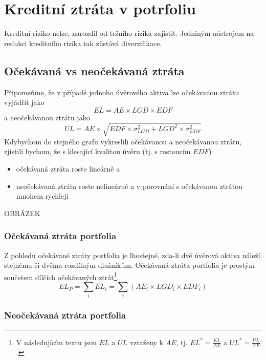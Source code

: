 \chapter{Kreditní ztráta v potrfoliu}

Kreditní riziko nelze, narozdíl od tržního rizika zajistit. Jedniným nástrojem na redukci kreditního rizika tak zůstává diverzifikace.

\section{Očekávaná vs neočekávaná ztráta}

Připomeňme, že v případě jednoho úvěrového aktiva lze očekávanou ztrátu vyjádřit jako
\begin{equation*}
EL = AE \times LGD \times EDF
\end{equation*}
a neočekávanou ztrátu jako
\begin{equation*}
UL = AE \times \sqrt{EDF \times \sigma_{LGD}^2 + LGD^2 \times \sigma_{EDF}^2}
\end{equation*}
Kdybychom do stejného grafu vykreslili očekávanou a neočekávanou ztrátu, zjistili bychom, že s klesající kvalitou úvěru (tj. s rostoucím $EDF$)
\begin{itemize}
\item očekávaná ztráta roste lineárně a
\item neočekávaná ztráta roste nelineárně a v porovnání s očekávanou ztrátou mnohem rychleji
\end{itemize}

OBRÁZEK

\subsection{Očekávaná ztráta portfolia}

Z pohledu očekávané ztráty portfolia je lhostejné, zda-li dvě úvěrová aktiva náleží stejnému či dvěma rozdílným dlužníkům. Očekávaná ztráta portfolia je prostým součetem dílčích očekávaných ztrát\footnote{V následujícím textu jsou $EL$ a $UL$ vztaženy k $AE$, tj. $EL^* = \frac{EL}{AE}$ a $UL^* = \frac{UL}{AE}$.}.
\begin{equation*}
EL_P = \sum_i EL_i = \sum_i \left(AE_i \times LGD_i \times EDF_i \right)
\end{equation*}

\subsection{Neočekávaná ztráta portfolia}

